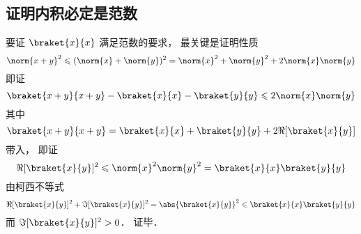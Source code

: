 \subsection{证明内积必定是范数}
要证 $\braket{x}{x}$ 满足范数的要求， 最关键是证明性质
\begin{equation}
\norm{x+y}^2 \leqslant (\norm{x} + \norm{y})^2 = \norm{x}^2 + \norm{y}^2 + 2\norm{x}\norm{y}
\end{equation}
即证
\begin{equation}
\braket{x+y}{x+y} - \braket{x}{x} - \braket{y}{y} \leqslant 2\norm{x}\norm{y}
\end{equation}
其中
\begin{equation}
\braket{x+y}{x+y} = \braket{x}{x} + \braket{y}{y} + 2\Re[{\braket{x}{y}}]
\end{equation}
带入， 即证
\begin{equation}
\Re[{\braket{x}{y}}]^2 \leqslant \norm{x}^2\norm{y}^2 = \braket{x}{x}\braket{y}{y}
\end{equation}
由柯西不等式
\begin{equation}
\Re[\braket{x}{y}]^2 + \Im[\braket{x}{y}]^2 = \abs{\braket{x}{y}}^2 \leqslant \braket{x}{x}\braket{y}{y}
\end{equation}
而 $\Im[\braket{x}{y}]^2 > 0$． 证毕．
